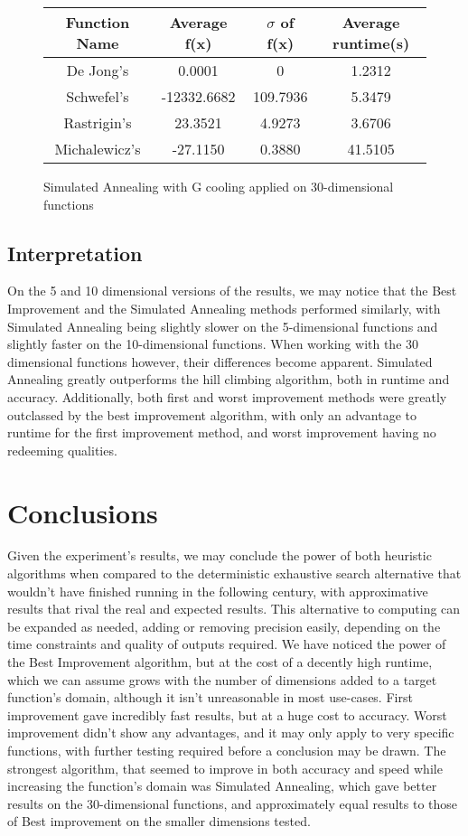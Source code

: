 \documentclass{article}
\begin{document}
\begin{figure}[H]
    \begin{tabular}{|c||c|c|c|} \hline
        Function Name & Average f(x) & $\sigma$ of f(x) & Average runtime(s) \\ \hline \hline
        De Jong's & 0.0001 & 0 & 1.2312 \\ \hline
        Schwefel's & -12332.6682 & 109.7936 & 5.3479 \\ \hline
        Rastrigin's & 23.3521 & 4.9273 & 3.6706 \\ \hline
        Michalewicz's & -27.1150 & 0.3880 & 41.5105 \\ \hline
    \end{tabular}
    \caption{Simulated Annealing with G cooling applied on 30-dimensional functions}
    \end{figure}

\subsection{Interpretation}
On the 5 and 10 dimensional versions of the results, we may notice that the Best Improvement and the Simulated Annealing methods performed similarly, with Simulated Annealing being slightly slower on the 5-dimensional functions and slightly faster on the 10-dimensional functions. When working with the 30 dimensional functions however, their differences become apparent. Simulated Annealing greatly outperforms the hill climbing algorithm, both in runtime and accuracy. Additionally, both first and worst improvement methods were greatly outclassed by the best improvement algorithm, with only an advantage to runtime for the first improvement method, and worst improvement having no redeeming qualities.

\section{Conclusions}
Given the experiment's results, we may conclude the power of both heuristic algorithms when compared to the deterministic exhaustive search alternative that wouldn't have finished running in the following century, with approximative results that rival the real and expected results. This alternative to computing can be expanded as needed, adding or removing precision easily, depending on the time constraints and quality of outputs required. We have noticed the power of the Best Improvement algorithm, but at the cost of a decently high runtime, which we can assume grows with the number of dimensions added to a target function's domain, although it isn't unreasonable in most use-cases. First improvement gave incredibly fast results, but at a huge cost to accuracy. Worst improvement didn't show any advantages, and it may only apply to very specific functions, with further testing required before a conclusion may be drawn. The strongest algorithm, that seemed to improve in both accuracy and speed while increasing the function's domain was Simulated Annealing, which gave better results on the 30-dimensional functions, and approximately equal results to those of Best improvement on the smaller dimensions tested.
\end{document}
